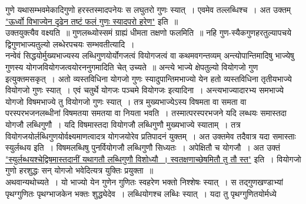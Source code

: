 \documentclass[11pt, openany]{book}
\begin{document}
\newpage%

\noindent गुणे यथासम्भवमेकादिगुणो हरस्तस्मादपनेयः स लघुतरो गुणः स्यात्~। 
एवमेव तल्लब्धिश्च~। अत उक्तम्\textendash \\

\vspace{-3mm}
\hyperref[28]{"ऊर्ध्वो विभाज्येन दृढेन तष्टं फलं गुणः स्यादपरो हरेण"}  इति~॥ \\

\vspace{-3mm}
 उक्तयुक्त्यैव वक्ष्यति~॥ गुणलब्ध्योस्समं ग्राह्यं धीमता तक्षणो फलमिति~॥ नहि गुण-स्यैकगुणहरतुल्यापचये द्विगुणभाज्यतुल्यो लब्धेरपचयः सम्भवतीत्यादि~। \\

 \vspace{-3mm}
 नन्वेवं सिद्धयोर्मुख्यभाज्यस्य लब्धिगुणयोर्योगजत्वं वियोगजत्वं वा 
कथमवगन्तव्यम् अन्त्योपान्तिमादिषु भाज्येषु गुणस्य योगजवियोगजत्वयोरननुगमादिति चेत् उच्यते~॥ अन्त्ये भाज्ये क्षेपतुल्यो वियोगजो गुण 
इत्युक्तमसकृत्~। अतो व्यस्तविधिना योगजो गुणः स्यादुपान्तिमभाज्यो येन
हतो व्यस्तविधिना तृतीयभाज्ये वियोगजो गुणः स्यात्~। एवं चतुर्थे योगजः 
पञ्चमे वियोगजः इत्यादिना~। अन्त्यभाज्यादारभ्य समभाज्ये योगजो विषमभाज्ये तु वियोगजो गुणः स्यात्~। तत्र मुख्यभाज्येऽस्य विषमता वा 
समता वा परस्परभजनलब्धीनां विषमतया समतया वा नियता भवति~। 
तस्मात्परस्परभजने यदि लब्धयः समास्तदा योगजौ लब्धिगुणौ~। यदि विषमास्तदा
वियोगजौ लब्धिगुणौ मुख्यभाज्ये स्याताम्~। तत्र
वियोगजयोर्लब्धिगुणयोर्वक्ष्यमाणत्वादत्र योगजयोरेव प्रतिपादनं युक्तम्~। अत उक्तमेव तदैवात्र यदा समास्ताः स्युर्लब्धय इति~। विषमलब्धिषु पुनर्वियोगजौ लब्धिगुणौ सिध्यतः~। अपेक्षितौ च योगजौ~। अत उक्तं \hyperref[29]{"स्युर्लब्धयश्चेद्विषमास्तदानीं यथागतौ लब्धिगुणौ विशोध्यौ~। स्वतक्षणाच्छेषमितौ  तु तौ स्त"} इति~। वियोगजो गुणो हरशुद्धः सन् योगजो भवेदित्यत्र युक्तिः प्रयुक्ता~॥ \\

\vspace{-3mm}
 अथवान्यथोच्यते~। यो भाज्यो येन गुणेन गुणितः स्वहरेण भक्तो 
निश्शेषः स्यात्~। स तद्गुणखण्डाभ्यां पृथग्गुणितः पृथग्भाजकेन भक्तः 
शुद्ध्येदेव~। लब्धियोगश्च लब्धिः स्यात्~। यदा तु पृथग्गुणितयोर्मध्ये

\newpage%
\end{document}
